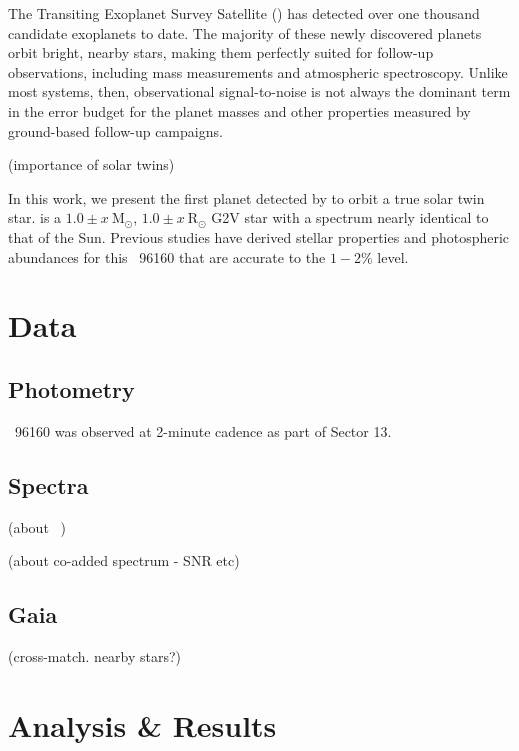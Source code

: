 \documentclass[modern]{aastex62}
\newcommand{\hoststar}{\acronym{HIP}\ 96160\xspace}
\newcommand{\stmass}{$1.0 \pm x\ \textrm{M}_{\odot}$\xspace}
\newcommand{\stradius}{$1.0 \pm x\ \textrm{R}_{\odot}$\xspace}
\begin{document}
The Transiting Exoplanet Survey Satellite (\TESS) has detected over one thousand candidate exoplanets to date. 
The majority of these newly discovered planets orbit bright, nearby stars, making them perfectly suited for follow-up observations, including mass measurements and atmospheric spectroscopy. 
Unlike most \kepler systems, then, observational signal-to-noise is not always the dominant term in the error budget for the planet masses and other properties measured by ground-based follow-up campaigns.

(importance of solar twins)

In this work, we present the first planet detected by \TESS to orbit a true solar twin star. 
\object[HIP96160]{\hoststar} is a \stmass, \stradius G2V star with a spectrum nearly identical to that of the Sun. 
Previous studies have derived stellar properties and photospheric abundances for this \hoststar that are accurate to the $1-2 \%$ level.



\section{Data}
\label{s:data}

\subsection{Photometry}

\hoststar was observed at 2-minute cadence as part of \TESS Sector 13. 


\subsection{Spectra}

(about \HARPS\ \RVs)

(about co-added spectrum - SNR etc)

\subsection{Gaia}

(cross-match. nearby stars?)

\section{Analysis \& Results}
\label{s:analysis}
\end{document}
